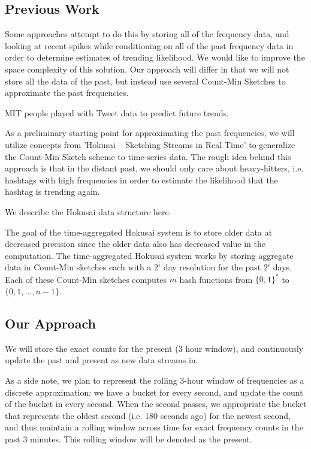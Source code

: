 \documentclass[twoside]{article}
\newcommand{\cc}[1]
 {\textbf{\cite{#1}}}
\begin{document}
\begin{multicols}{2}
\subsection{Previous Work} \label{sec:PreviousWork}


Some approaches attempt to do this by storing all of the frequency data, and looking at recent spikes while conditioning on all of the past frequency data in order to determine estimates of trending likelihood. We would like to improve the space complexity of this solution. Our approach will differ in that we will not store all the data of the past, but instead use several Count-Min Sketches to approximate the past frequencies. 

MIT people played with Tweet data to predict future trends. 

As a preliminary starting point for approximating the past frequencies, we will utilize concepts from 'Hokusai -- Sketching Streams in Real Time' \cc{Matusevych:2012} to generalize the Count-Min Sketch scheme to time-series data. The rough idea behind this approach is that in the distant past, we should only care about heavy-hitters, i.e. hashtags with high frequencies in order to estimate the likelihood that the hashtag is trending again.

We describe the Hokusai data structure here. 

The goal of the time-aggregated Hokusai system is to store older data at decreased precision since the older data also has decreased value in the computation.  The time-aggregated Hokusai system works by storing aggregate data in Count-Min sketches each with a $2^i$ day resolution for the past $2^i$ days.  Each of these Count-Min sketches computes $m$ hash functions from $\{0,1\}^*$ to $\{0, 1, …, n-1\}$.


\subsection{Our Approach}


We will store the exact counts for the present (3 hour window), and continuously update the past and present as new data streams in. 


As a side note, we plan to represent the rolling 3-hour window of frequencies as a discrete approximation: we have a bucket for every second, and update the count of the bucket in every second. When the second passes, we appropriate the bucket that represents the oldest second (i.e. 180 seconds ago) for the newest second, and thus maintain a rolling window across time for exact frequency counts in the past 3 minutes. This rolling window will be denoted as the present.



\end{multicols}
\end{document}
